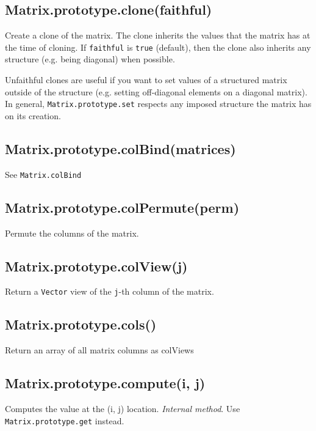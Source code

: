 \documentclass{article}
\begin{document}
    \subsection*{Matrix.prototype.clone(faithful)}
    Create a clone of the matrix. The clone inherits the values that the matrix
has at the time of cloning. If \texttt{faithful} is \texttt{true} (default), then the clone
also inherits any structure (e.g. being diagonal) when possible.


Unfaithful clones are useful if you want to set values of a structured matrix
outside of the structure (e.g. setting off-diagonal elements on a diagonal matrix).
In general, \texttt{Matrix.prototype.set} respects any imposed structure the matrix has
on its creation.


    \subsection*{Matrix.prototype.colBind(matrices)}
    See \texttt{Matrix.colBind}


    \subsection*{Matrix.prototype.colPermute(perm)}
    Permute the columns of the matrix.


    \subsection*{Matrix.prototype.colView(j)}
    Return a \texttt{Vector} view of the \texttt{j}-th column of the matrix.


    \subsection*{Matrix.prototype.cols()}
    Return an array of all matrix columns as colViews


    \subsection*{Matrix.prototype.compute(i, j)}
    Computes the value at the (i, j) location. \emph{Internal method}. Use \texttt{Matrix.prototype.get}
instead.
\end{document}

